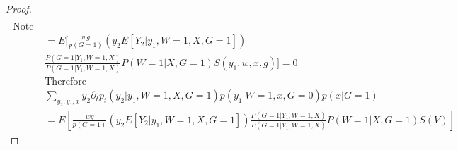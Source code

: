 \documentclass{article}
\begin{document}
\begin{proof}
\begin{align}
\end{align}
\begin{align}
\text{    Note that } \\
&=    E [  \frac{ w g }{ p (G = 1) } ( y_2  E [ Y_2 | y_1 , W = 1, X, G =1 ] )   \\
&\frac{ P( G =1 | Y_1 , W=1 , X ) }{ P(G=1 | Y_1 , W=1 , X ) } P( W=1 | X , G=1)   S (  y_1 , w, x , g) ] = 0 \\
&\text{Therefore  }\\
&\sum_ { y_2 ,y_1,x} y_2 \partial_t p_t ( y_2| y_1 , W= 1, X , G= 1) p ( y_1 | W =1 , x, G= 0 ) p( x | G =1 ) \\
&= E [  \frac{ w g }{ p (G = 1) } ( y_2  E [ Y_2 | y_1 , W = 1, X, G =1 ] )     \frac{ P( G =1 | Y_1 , W=1 , X ) }{ P(G=1 | Y_1 , W=1 , X ) } P( W=1 | X , G=1)   S ( V) ]
\end{align}



\end{proof}
\end{document}
